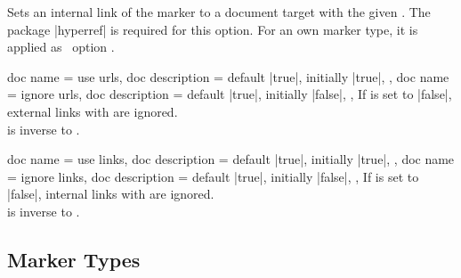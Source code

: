 \begin{docMrcKeys}[
  doc keypath     = marker,
  doc name        = link,
  doc parameter   = {=\meta{name}},
  doc description = {no default, initially empty},
  doc new         = 2020-05-04,
]{}
  Sets an internal link of the marker to a document target with
  the given .
  The package |hyperref| is required for this option.
  For an own marker type, it is applied as \tikzname\ option .
\end{docMrcKeys}



\begin{docMrcKeys}[
  doc keypath     = marker,
  doc parameter   = {\colOpt{=true\textbar false}},
  doc new         = 2020-05-04,
]{
  {
    doc name        = use urls,
    doc description = {default |true|, initially |true|},
  },
  {
    doc name        = ignore urls,
    doc description = {default |true|, initially |false|},
  },
}
  If  is set to |false|, external links
  with  are ignored.\\
   is inverse to .
\end{docMrcKeys}


\begin{docMrcKeys}[
  doc keypath     = marker,
  doc parameter   = {\colOpt{=true\textbar false}},
  doc new         = 2020-05-04,
]{
  {
    doc name        = use links,
    doc description = {default |true|, initially |true|},
  },
  {
    doc name        = ignore links,
    doc description = {default |true|, initially |false|},
  },
}
  If  is set to |false|, internal links
  with  are ignored.\\
   is inverse to .
\end{docMrcKeys}



\clearpage
\subsection{Marker Types}

